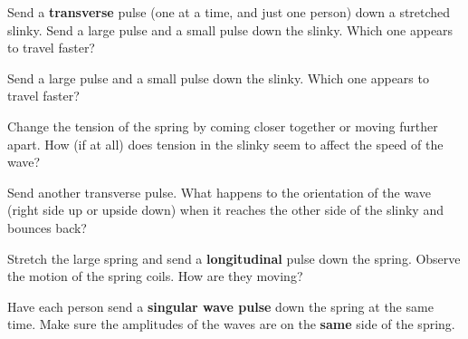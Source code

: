 \documentclass[10pt]{exam}
\begin{document}
\begin{questions}

  \question
    Send a {\bf transverse} pulse (one at a time, and just one person) down a stretched slinky.  Send a large pulse and a small pulse down the slinky. Which one appears to travel faster? 
    \vs
  
  \question
    Send a large pulse and a small pulse down the slinky. Which one appears to travel faster? 
    \vs
  
  \question
    Change the tension of the spring by coming closer together or moving further apart.  How (if at all) does tension in the slinky seem to affect the speed of the wave?
    \vs
  
  \question
    Send another transverse pulse.  What happens to the orientation of the wave (right side up or upside down) when it reaches the other side of the slinky and bounces back?
    \vs

      

  \pagebreak
  
  \question
    Stretch the large spring and send a {\bf longitudinal} pulse down the spring.  Observe the motion of the spring coils.  How are they moving?
    \vs

  \question
    Have each person send a {\bf singular wave pulse} down the spring at the same time.  Make sure the amplitudes of the waves are on the {\bf same} side of the spring.  
  
\end{questions}
\end{document}
